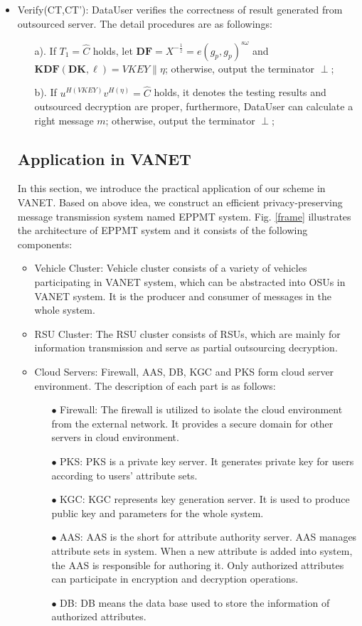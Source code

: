 \documentclass[smallextended]{svjour3}       %
\begin{document}
\begin{itemize}
	\item Verify(CT,CT'): DataUser verifies the correctness of result generated from outsourced server.
		  The detail procedures are as followings: 
		\begin{itemize}
			\item[a).] If $T_1=\widehat{C}$ holds, let $\textbf{DF}=X^{-\frac{1}{z}}=e(g_p,g_p)^{s \omega}$ and $\textbf{KDF}(\textbf{DK},\ell)=VKEY \parallel \eta$; otherwise, output the terminator $\perp$;
			\item[b).] If $u^{H(VKEY)}v^{H(\eta)}=\widehat{C}$ holds, it denotes the testing results and outsourced decryption are proper, furthermore, DataUser can calculate a right message $m$; otherwise, output the terminator $\perp$; 
		\end{itemize}
	
	\subsection{Application in VANET}
	In this section, we introduce the practical application of our scheme in VANET.
	Based on above idea, we construct an efficient privacy-preserving message transmission system named EPPMT system.
	Fig. \ref{frame} illustrates the architecture of EPPMT system and it consists of the following components: 
	\begin{itemize}
		\item Vehicle Cluster: Vehicle cluster consists of a variety of vehicles participating in VANET system, which can be abstracted into OSUs in VANET system.
							   It is the producer and consumer of messages in the whole system.
		\item RSU Cluster: The RSU cluster consists of RSUs, which are mainly for information transmission and serve as partial outsourcing decryption.
		\item Cloud Servers: Firewall, AAS, DB, KGC and PKS form cloud server environment. The description of each part is as follows:
		\begin{itemize}
			\item [$\bullet$] Firewall: The firewall is utilized to isolate the cloud environment from the external network. 
										It provides a secure domain for other servers in cloud environment.
			\item [$\bullet$] PKS: PKS is a private key server. It generates private key for users according to users' attribute sets.
			\item [$\bullet$] KGC: KGC represents key generation server. It is used to produce public key and parameters for the whole system.
			\item [$\bullet$] AAS: AAS is the short for attribute authority server. 
								   AAS manages attribute sets in system.
								   When a new attribute is added into system, the AAS is responsible for authoring it.
								   Only authorized attributes can participate in encryption and decryption operations.
			\item [$\bullet$] DB:  DB means the data base used to store the information of authorized attributes.
		\end{itemize}
	\end{itemize}


\end{itemize}
\end{document}

